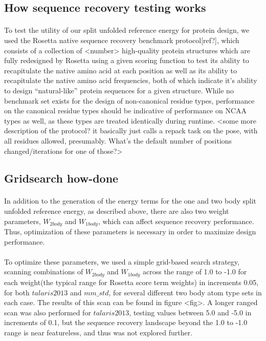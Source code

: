 \subsection{How sequence recovery testing works}
\paragraph{}
To test the utility of our split unfolded reference energy for protein design, we used the Rosetta native sequence recovery benchmark protocol[ref?], which consists of a collection of <number> high-quality protein structures which are fully redesigned by Rosetta using a given scoring function to test its ability to recapitulate the native amino acid at each position as well as its ability to recapitulate the native amino acid frequencies, both of which indicate it's ability to design ``natural-like'' protein sequences for a given structure. While no benchmark set exists for the design of non-canonical residue types, performance on the canonical residue types should be indicative of performance on NCAA types as well, as these types are treated identically during runtime. <some more description of the protocol? it basically just calls a repack task on the pose, with all residues allowed, presumably. What's the default number of positions changed/iterations for one of those?>


\subsection{Gridsearch how-done}
\paragraph{}
In addition to the generation of the energy terms for the one and two body split unfolded reference energy, as described above, there are also two weight parameters, $W_{2body}$ and $W_{1body}$, which can affect sequence recovery performance. Thus, optimization of these parameters is necessary in order to maximize design performance. 

\paragraph{}
To optimize these parameters, we used a simple grid-based search strategy, scanning combinations of $W_{2body}$ and $W_{1body}$ across the range of 1.0 to -1.0 for each weight(the typical range for Rosetta score term weights) in increments 0.05, for both $talaris2013$ and $mm\_std$, for several different two body atom type sets in each case. The results of this scan can be found in figure <fig>. A longer ranged scan was also performed for $talaris2013$, testing values between 5.0 and -5.0 in increments of 0.1, but the sequence recovery landscape beyond the 1.0 to -1.0 range is near featureless, and thus was not explored further.
